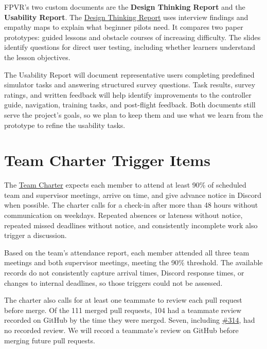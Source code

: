 \documentclass{article}
\begin{document}
FPVR's two custom documents are the \textbf{Design Thinking Report} and the
\textbf{Usability Report}. The \href{https://softwaremandems.github.io/FPVR/CDs/DesignThinking/DesignThinking.pdf}{Design Thinking Report}
uses interview findings and empathy maps to explain what beginner pilots need.
It compares two paper prototypes: guided lessons and obstacle courses of
increasing difficulty. The slides identify questions for direct user testing,
including whether learners understand the lesson objectives.

The Usability Report will document representative users completing predefined
simulator tasks and answering structured survey questions. Task results, survey ratings, and
written feedback will help identify improvements to the controller guide,
navigation, training tasks, and post-flight feedback. Both documents still
serve the project's goals, so we plan to keep them and use what we learn from
the prototype to refine the usability tasks.

\section{Team Charter Trigger Items}

The
\href{https://github.com/SoftwareMandems/FPVR/blob/b9ffc85a6e601fa25f906428faeb0058c3502530/docs/DevelopmentPlan/DevelopmentPlan.tex#L568-L615}{Team Charter}
expects each member to attend at least 90\% of scheduled team and supervisor
meetings, arrive on time, and give advance notice in Discord when possible.
The charter calls for a check-in after more than 48 hours without
communication on weekdays. Repeated absences or lateness without notice,
repeated missed deadlines without notice, and consistently incomplete work
also trigger a discussion.

Based on the team's attendance report, each member attended all three team
meetings and both supervisor meetings, meeting the 90\% threshold. The
available records do not consistently capture arrival times, Discord response
times, or changes to internal deadlines, so those triggers could not be
assessed.

The charter also calls for at least one teammate to review each pull request
before merge. Of the 111 merged pull requests, 104 had a teammate review
recorded on GitHub by the time they were merged. Seven, including
\href{https://github.com/SoftwareMandems/FPVR/pull/314}{\#314}, had no
recorded review. We will record a teammate's review on GitHub before merging
future pull requests.
\end{document}
